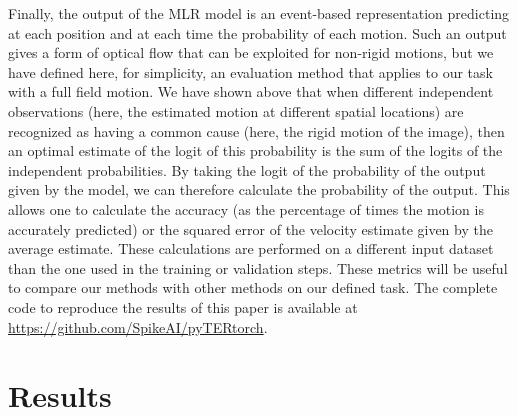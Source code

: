 \documentclass[default]{sn-jnl}%
\theoremstyle{thmstyleone}%
\theoremstyle{thmstyletwo}%
\theoremstyle{thmstylethree}%
\begin{document}
%
Finally, the output of the MLR model is an event-based representation predicting at each position and at each time the probability of each motion. Such an output gives a form of optical flow that can be exploited for non-rigid motions, but we have defined here, for simplicity, an evaluation method that applies to our task with a full field motion. We have shown above that when different independent observations (here, the estimated motion at different spatial locations) are recognized as having a common cause (here, the rigid motion of the image), then an optimal estimate of the logit of this probability is the sum of the logits of the independent probabilities. By taking the logit of the probability of the output given by the model, we can therefore calculate the probability of the output. This allows one to calculate the accuracy (as the percentage of times the motion is accurately predicted) or the squared error %
of the velocity estimate given by the average estimate. 
These calculations are performed on a different input dataset than the one used in the training or validation steps. These metrics will be useful to compare our methods with other methods on our defined task.  The complete code to reproduce the results of this paper is available at \url{https://github.com/SpikeAI/pyTERtorch}.  
%
\section{Results}
\label{sec:results}
\end{document}
